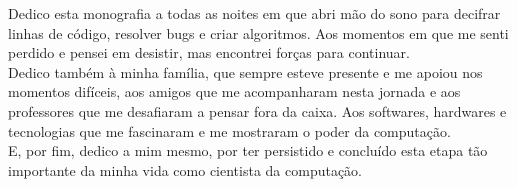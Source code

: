 
Dedico esta monografia a todas as noites em que abri mão do sono para decifrar linhas de código, resolver bugs e criar algoritmos.
Aos momentos em que me senti perdido e pensei em desistir, mas encontrei forças para continuar. \\
Dedico também à minha família, que sempre esteve presente e me apoiou nos momentos difíceis, aos amigos que me acompanharam nesta jornada e aos professores que me desafiaram a pensar fora da caixa. 
Aos softwares, hardwares e tecnologias que me fascinaram e me mostraram o poder da computação. \\
E, por fim, dedico a mim mesmo, por ter persistido e concluído esta etapa tão importante da minha vida como cientista da computação.
